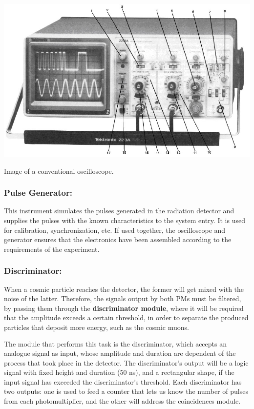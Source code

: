 	\bfi[H]
		\noindent\begin{minipage}{0.5\textwidth} 
			\bc\includegraphics[width=.9\textwidth]{img/scope.jpg}\ec
		\end{minipage}
		\begin{minipage}{0.5\textwidth} 
			\captionsetup{width=0.8\textwidth}
			\caption[Image of a conventional oscilloscope.]{Image of a conventional oscilloscope.}\label{fig:scope}
		\end{minipage}\captionsetup{width=0.8\textwidth}
	\efi

		\subsubsection{Pulse Generator:}

This instrument simulates the pulses generated in the radiation detector and supplies the pulses with the known characteristics to the system entry. It is used for calibration, synchronization, etc. If used together, the oscilloscope and generator ensures that the electronics have been assembled according to the requirements of the experiment.

		\subsubsection{Discriminator:}

When a cosmic particle reaches the detector, the former will get mixed with the noise of the latter. Therefore, the signals output by both PMs must be filtered, by passing them through the \textbf{discriminator module}, where it will be required that the amplitude exceeds a certain threshold, in order to separate the produced particles that deposit more energy, such as the cosmic muons.

The module that performs this task is the discriminator, which accepts an analogue signal as input, whose amplitude and duration are dependent of the process that took place in the detector. The discriminator's output will be a logic signal with fixed height and duration (50 ns), and a rectangular shape, if the input signal has exceeded the discriminator's threshold. Each discriminator has two outputs: one is used to feed a counter that lets us know the number of pulses from each photomultiplier, and the other will address the coincidences module.

